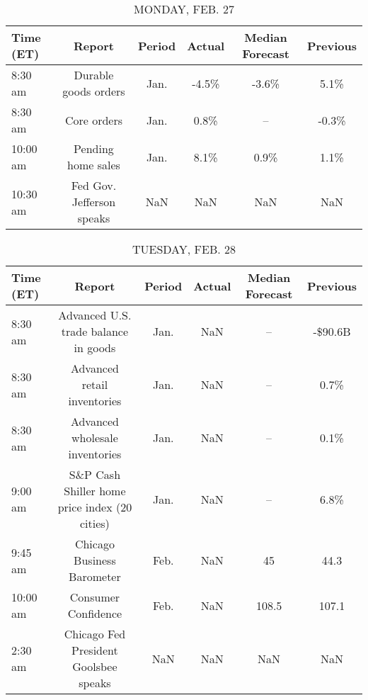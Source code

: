 \documentclass{article}%
\begin{document}
%
\normalsize%


\begin{table}[htbp]%
\caption{MONDAY, FEB. 27}%
\centering%
\begin{adjustbox}{width=1\textwidth}%
\begin{tabular}{lccccc}
\toprule
Time (ET) &                    Report & Period & Actual & Median Forecast & Previous \\
\midrule
  8:30 am &      Durable goods orders &   Jan. &  -4.5\% &           -3.6\% &     5.1\% \\
  8:30 am &               Core orders &   Jan. &   0.8\% &              -- &    -0.3\% \\
 10:00 am &        Pending home sales &   Jan. &   8.1\% &            0.9\% &     1.1\% \\
 10:30 am & Fed Gov. Jefferson speaks &    NaN &    NaN &             NaN &      NaN \\
\bottomrule
\end{tabular}
%
\end{adjustbox}%
\end{table}

%


\begin{table}[htbp]%
\caption{TUESDAY, FEB. 28}%
\centering%
\begin{adjustbox}{width=1\textwidth}%
\begin{tabular}{lccccc}
\toprule
Time (ET) &                                        Report & Period & Actual & Median Forecast & Previous \\
\midrule
  8:30 am &          Advanced U.S. trade balance in goods &   Jan. &    NaN &              -- &  -\$90.6B \\
  8:30 am &                   Advanced retail inventories &   Jan. &    NaN &              -- &     0.7\% \\
  8:30 am &                Advanced wholesale inventories &   Jan. &    NaN &              -- &     0.1\% \\
  9:00 am & S\&P Cash Shiller home price index (20 cities) &   Jan. &    NaN &              -- &     6.8\% \\
  9:45 am &                    Chicago Business Barometer &   Feb. &    NaN &              45 &     44.3 \\
 10:00 am &                           Consumer Confidence &   Feb. &    NaN &           108.5 &    107.1 \\
  2:30 am &         Chicago Fed President Goolsbee speaks &    NaN &    NaN &             NaN &      NaN \\
\bottomrule
\end{tabular}
%
\end{adjustbox}%
\end{table}
\end{document}
